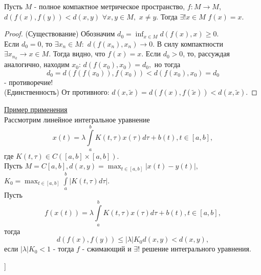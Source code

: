 \begin{theorem}
Пусть $M$ - полное компактное метрическое пространство, $f:M \rightarrow M$, $d(f(x), f(y)) < d(x, y)$ $\forall x, y \in M,$ $x \neq y.$ Тогда $\exists!x \in M$ $f(x)=x$.
\end{theorem}
\begin{proof}
    (Существование) Обозначим $d_0=\inf_{x \in M}{d(f(x), x)} \geq 0.$ \\
    Если $d_0 = 0$, то $\exists x_n \in M:$ $d(f(x_n), x_n) \rightarrow 0.$ В силу компактности $\exists x_{n_k} \rightarrow x \in M$. Тогда видно, что $f(x)=x$.
    Если $d_0 > 0$, то, рассуждая аналогично, находим $x_0$: $d(f(x_0), x_0)=d_0,$ но тогда
    \begin{equation*}
        d_0 = d(f(f(x_0)), f(x_0)) < d(f(x_0), x_0) = d_0
    \end{equation*}
    - противоречие! \\
    (Единственность) От противного: $d(x, \tilde{x})=d(f(x),f(\tilde{x})) < d(x, \tilde{x}).$
\end{proof}

{\large \underline{Пример применения}} \\
Рассмотрим линейное интегральное уравнение
\begin{equation*}
    x(t) = \lambda \int\limits_a^b K(t, \tau)x(\tau)d\tau + b(t), t \in [a,b],
\end{equation*}
где $K(t, \tau) \in C([a,b] \times [a,b]).$ \\
Пусть $M=C[a,b], d(x,y) = \max_{t \in [a,b]}|x(t)-y(t)|,$ $ K_0 = \max_{t \in [a,b]} \int\limits_a^b|K(t,\tau)d\tau|.$ \\
Пусть
\begin{equation*}
    f(x(t)) = \lambda \int\limits_a^b K(t, \tau)x(\tau)d\tau + b(t), t \in [a,b],
\end{equation*}
тогда
\begin{equation*}
    d(f(x), f(y)) \leq |\lambda|K_0d(x,y) < d(x,y),
\end{equation*}
если $|\lambda|K_0 < 1$ - тогда $f$ - сжимающий и $\exists!$ решение интегрального уравнения.

\bigbreak
[\cite[page 49-52]{moiseev}]
